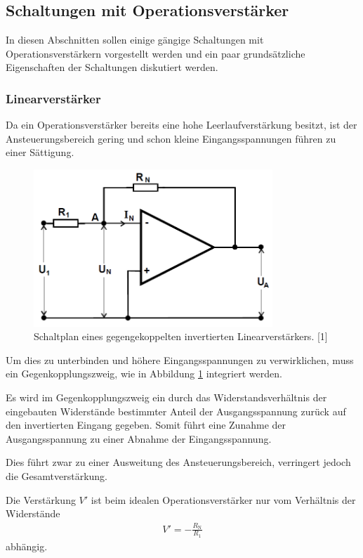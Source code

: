 \documentclass[]{scrartcl}
\begin{document}
\subsection{Schaltungen mit Operationsverstärker}
In diesen Abschnitten sollen einige gängige Schaltungen mit Operationsverstärkern vorgestellt werden und ein paar grundsätzliche Eigenschaften der Schaltungen diskutiert werden.
\subsubsection{Linearverstärker}
Da ein Operationsverstärker bereits eine hohe Leerlaufverstärkung besitzt, ist der Ansteuerungsbereich gering und schon kleine Eingangsspannungen führen zu einer Sättigung.
\begin{figure}[H]
\centering
\includegraphics[width=9cm]{images/schaltplan_linearverstaerker.png}
\caption{Schaltplan eines gegengekoppelten invertierten Linearverstärkers. [1]}
\label{fig:schaltplan_linearverstaerker}
\end{figure}
Um dies zu unterbinden und höhere Eingangsspannungen zu verwirklichen, muss ein Gegenkopplungszweig, wie in Abbildung \ref{fig:schaltplan_linearverstaerker} integriert werden.

Es wird im Gegenkopplungszweig ein durch das Widerstandsverhältnis der eingebauten Widerstände bestimmter Anteil der Ausgangsspannung zurück auf den invertierten Eingang gegeben. Somit führt eine Zunahme der Ausgangsspannung zu einer Abnahme der Eingangsspannung.

Dies führt zwar zu einer Ausweitung des Ansteuerungsbereich, verringert jedoch die Gesamtverstärkung.

Die Verstärkung $V'$ ist beim idealen Operationsverstärker nur vom Verhältnis der Widerstände
\begin{align}
V'=-\frac{R_{\text{N}}}{R_{1}}
\label{eq:verstaerkung_ideal}
\end{align}
abhängig.
\end{document}
